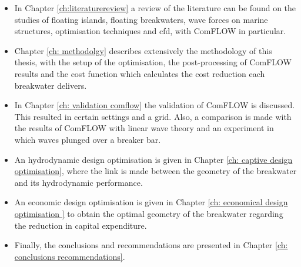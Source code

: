 \begin{itemize}
    \item In Chapter \ref{ch:literaturereview} a review of the literature can be found on the studies of floating islands, floating breakwaters, wave forces on marine structures, optimisation techniques and \acrfull{cfd}, with ComFLOW in particular. 
    \item Chapter \ref{ch: methodolgy} describes extensively the methodology of this thesis, with the setup of the optimisation, the post-processing of ComFLOW results and the cost function which calculates the cost reduction each breakwater delivers.
    \item In Chapter \ref{ch: validation comflow} the validation of ComFLOW is discussed. This resulted in certain settings and a grid. Also, a comparison is made with the results of ComFLOW with linear wave theory and an experiment in which waves plunged over a breaker bar. 
    \item An hydrodynamic design optimisation is given in Chapter \ref{ch: captive design optimisation}, where the link is made between the geometry of the breakwater and its hydrodynamic performance. 
    \item An economic design optimisation is given in Chapter \ref{ch: economical design optimisation } to obtain the optimal geometry of the breakwater regarding the reduction in capital expenditure.
    \item Finally, the conclusions and recommendations are presented in Chapter \ref{ch: conclusions recommendations}.
\end{itemize}

